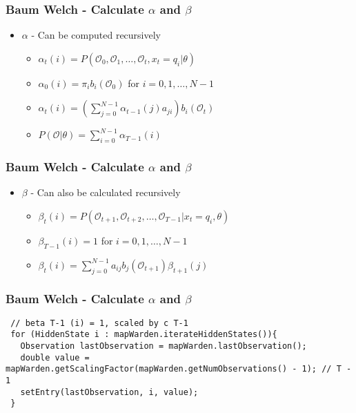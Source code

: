 
\begin{frame}
	\frametitle{Baum Welch - Calculate $\alpha$ and $\beta$}
	\begin{itemize}
		\item $\alpha$ - Can be computed recursively
		\begin{itemize}
			\item $\alpha_t(i) = P(\mathcal{O}_0, \mathcal{O}_1, \dots ,\mathcal{O}_t , x_t = q_i | \theta)$
			\item $\alpha_0(i) = \pi_i b_i(\mathcal{O}_0)$ for $i = 0, 1, \dots, N-1$
			\item $\alpha_t(i) = \left(\sum\limits_{j=0}^{N-1} \alpha_{t-1}(j)a_{ji}\right)b_i(\mathcal{O}_t)$
			\item $P(\mathcal{O}|\theta) = \sum\limits_{i=0}^{N-1} \alpha_{T-1}(i)$
		\end{itemize}
	\end{itemize}
\end{frame}

\begin{frame}
	\frametitle{Baum Welch - Calculate $\alpha$ and $\beta$}
	\begin{itemize}
		\item $\beta$ - Can also be calculated recursively
		\begin{itemize}
			\item $\beta_t(i) = P(\mathcal{O}_{t+1}, \mathcal{O}_{t+2}, \dots, \mathcal{O}_{T-1} | x_t = q_i, \theta)$
			\item $\beta_{T-1}(i) = 1$ for $i = 0, 1, \dots, N-1$
			\item $\beta_t(i) = \sum\limits_{j=0}^{N-1} a_{ij} b_j(\mathcal{O}_{t+1}) \beta_{t+1}(j)$
		\end{itemize}
	\end{itemize}
\end{frame}

\begin{frame}[fragile]
	\frametitle{Baum Welch - Calculate $\alpha$ and $\beta$}
	\begin{lstlisting}    
 // beta T-1 (i) = 1, scaled by c T-1
 for (HiddenState i : mapWarden.iterateHiddenStates()){
   Observation lastObservation = mapWarden.lastObservation();
   double value = mapWarden.getScalingFactor(mapWarden.getNumObservations() - 1); // T - 1
   setEntry(lastObservation, i, value);
 }
	\end{lstlisting}
\end{frame}

